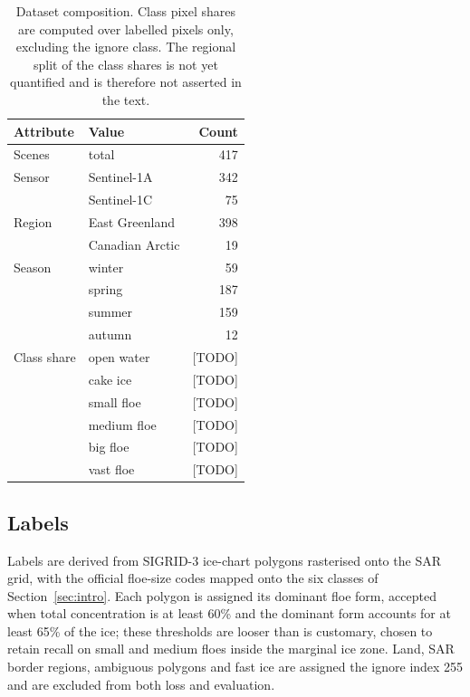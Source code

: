 \documentclass[preprint,12pt,authoryear]{elsarticle}
\begin{document}
\begin{table}[t]
\centering
\caption{Dataset composition. Class pixel shares are computed over labelled
pixels only, excluding the ignore class. The regional split of the class shares
is not yet quantified and is therefore not asserted in the text.}
\label{tab:dataset}
\begin{tabular}{llr}
\toprule
Attribute & Value & Count \\
\midrule
Scenes        & total                            & 417 \\
Sensor        & Sentinel-1A                      & 342 \\
              & Sentinel-1C                      & 75 \\
Region        & East Greenland                   & 398 \\
              & Canadian Arctic                  & 19 \\
Season        & winter                           & 59 \\
              & spring                           & 187 \\
              & summer                           & 159 \\
              & autumn                           & 12 \\
\midrule
Class share   & open water                       & [TODO] \\
              & cake ice                         & [TODO] \\
              & small floe                       & [TODO] \\
              & medium floe                      & [TODO] \\
              & big floe                         & [TODO] \\
              & vast floe                        & [TODO] \\
\bottomrule
\end{tabular}
\end{table}

\subsection{Labels}

Labels are derived from SIGRID-3 ice-chart polygons \citep{jcomm2010sigrid3}
rasterised onto the SAR grid, with the official floe-size codes mapped onto the
six classes of Section~\ref{sec:intro}. Each polygon is assigned its dominant
floe form, accepted when total concentration is at least 60\% and the dominant
form accounts for at least 65\% of the ice; these thresholds are looser than is
customary, chosen to retain recall on small and medium floes inside the marginal
ice zone. Land, SAR border regions, ambiguous polygons and fast ice are assigned
the ignore index 255 and are excluded from both loss and evaluation.
\end{document}
